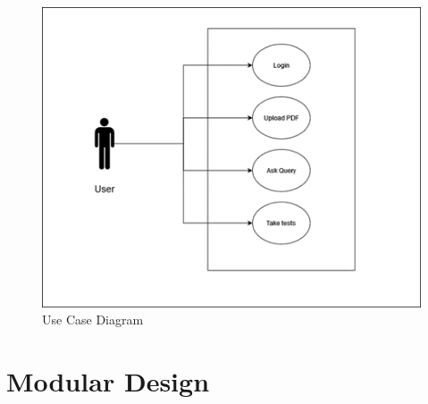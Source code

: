 \documentclass{report}
\begin{document}
\begin{figure}[h]
    \centering
    \includegraphics[width=\textwidth]{usecasediagram.png}
    \caption{Use Case Diagram}
\end{figure}

\section{Modular Design}

\end{document}

